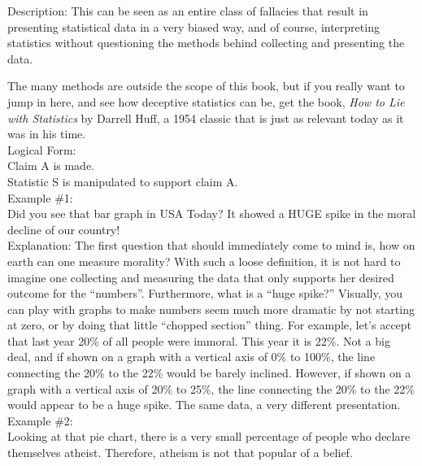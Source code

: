 \documentclass[a4paper,12pt,single,pdftex]{scrartcl}
\begin{document}
  
    Description: This can be seen as an entire class of fallacies that result in presenting statistical data in a very biased way, and of course, interpreting statistics without questioning the methods behind collecting and presenting the data.

    
      The many methods are outside the scope of this book, but if you really want to jump in here, and see how deceptive statistics can be, get the book, {\it How to Lie with Statistics} by Darrell Huff, a 1954 classic that is just as relevant today as it was in his time.
    \\

    
      Logical Form:
    \\

    
      Claim A is made.
    \\

    
      Statistic S is manipulated to support claim A.
    \\

    
      Example \#1:
    \\

    
      Did you see that bar graph in USA Today?  It showed a HUGE spike in the moral decline of our country!
    \\

    
      Explanation: The first question that should immediately come to mind is, how on earth can one measure morality?  With such a loose definition, it is not hard to imagine one collecting and measuring the data that only supports her desired outcome for the “numbers”.  Furthermore, what is a “huge spike?”  Visually, you can play with graphs to make numbers seem much more dramatic by not starting at zero, or by doing that little “chopped section” thing.  For example, let’s accept that last year 20\% of all people were immoral.  This year it is 22\%.  Not a big deal, and if shown on a graph with a vertical axis of 0\% to 100\%, the line connecting the 20\% to the 22\% would be barely inclined.  However, if shown on a graph with a vertical axis of 20\% to 25\%, the line connecting the 20\% to the 22\% would appear to be a huge spike. The same data, a very different presentation.
    \\

    
      Example \#2:
    \\

    
      Looking at that pie chart, there is a very small percentage of people who declare themselves atheist.  Therefore, atheism is not that popular of a belief.
    \\
\end{document}
